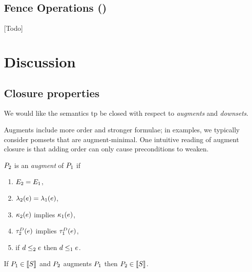 \subsection{Fence Operations (\xFENCE)}

[Todo]

\section{Discussion}
\subsection{Closure properties}

We would like the semantics tp be closed with respect to \emph{augments} and
\emph{downsets}.

Augments include more order and stronger formulae; in examples, we typically
consider pomsets that are augment-minimal.  One intuitive reading of augment
closure is that adding order can only cause preconditions to weaken.
\begin{definition}
  \label{def:augment}
  $P_2$ is an \emph{augment} of $P_1$ if
  \begin{enumerate}
  \item $E_2=E_1$,
  \item $\lambda_2(e)=\lambda_1(e)$,
  \item $\kappa_2(e)$ implies $\kappa_1(e)$,
  \item $\aTr[2]{\bEvs}{\aEv}$ implies $\aTr[1]{\bEvs}{\aEv}$,
  \item if $d\le_2e$ then $d\le_1e$.
  \end{enumerate}
\end{definition}

\begin{proposition}
  If $P_1\in\llbracket S\rrbracket$ and $P_2$  augments $P_1$ then $P_2\in\llbracket S\rrbracket$.
\end{proposition}

